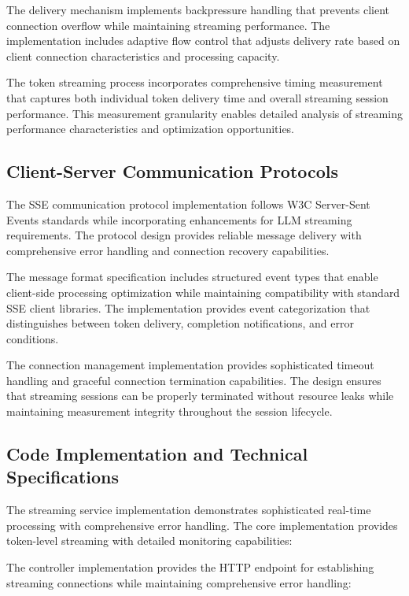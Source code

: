 The delivery mechanism implements backpressure handling that prevents client connection overflow while maintaining streaming performance. The implementation includes adaptive flow control that adjusts delivery rate based on client connection characteristics and processing capacity.

The token streaming process incorporates comprehensive timing measurement that captures both individual token delivery time and overall streaming session performance. This measurement granularity enables detailed analysis of streaming performance characteristics and optimization opportunities.

\subsection{Client-Server Communication Protocols}

The SSE communication protocol implementation follows W3C Server-Sent Events standards while incorporating enhancements for LLM streaming requirements. The protocol design provides reliable message delivery with comprehensive error handling and connection recovery capabilities.

The message format specification includes structured event types that enable client-side processing optimization while maintaining compatibility with standard SSE client libraries. The implementation provides event categorization that distinguishes between token delivery, completion notifications, and error conditions.

The connection management implementation provides sophisticated timeout handling and graceful connection termination capabilities. The design ensures that streaming sessions can be properly terminated without resource leaks while maintaining measurement integrity throughout the session lifecycle.

\subsection{Code Implementation and Technical Specifications}

The streaming service implementation demonstrates sophisticated real-time processing with comprehensive error handling. The core implementation provides token-level streaming with detailed monitoring capabilities:


The controller implementation provides the HTTP endpoint for establishing streaming connections while maintaining comprehensive error handling:



